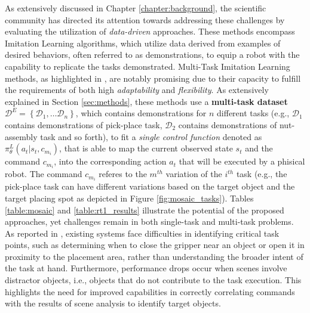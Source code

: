 As extensively discussed in Chapter \ref{chapter:background}, the scientific community has directed its attention towards addressing these challenges by evaluating the utilization of \textit{data-driven} approaches. These methods encompass Imitation Learning algorithms, which utilize data derived from examples of desired behaviors, often referred to as demonstrations, to equip a robot with the capability to replicate the tasks demonstrated.
\newline Multi-Task Imitation Learning methods, as highlighted in \cite{jang2022bc_z, dasari2021transformers_one_shot, mandi2022towards_more_generalizable_one_shot, brohan2022rt}, are notably promising due to their capacity to fulfill the requirements of both high \textit{adaptability} and \textit{flexibility}. As extensively explained in Section \ref{sec:methods}, these methods use a \textbf{multi-task dataset} $\mathcal{D}^{E} = \left \{ \mathcal{D}_{1}, \dots \mathcal{D}_{n}\right \}$, which contains demonstrations for $n$ different tasks (e.g., $\mathcal{D}_{1}$ contains demonstrations of pick-place task, $\mathcal{D}_{2}$ contains demonstrations of nut-assembly task and so forth), to fit a \textit{single control function} denoted as $\pi^{L}_{\theta}(a_{t}|s_{t}, c_{m_{i}})$, that is able to map the current observed state $s_{t}$ and the command $c_{m_{i}}$, into the corresponding action $a_{t}$ that will be executed by a phisical robot. The command $c_{m_{i}}$ referes to the $m^{th}$ variation of the $i^{th}$ task (e.g., the pick-place task can have different variations based on the target object and the target placing spot as depicted in Figure \ref{fig:mosaic_tasks}). Tables \ref{table:mosaic} and \ref{table:rt1_results} illustrate the potential of the proposed approaches, yet challenges remain in both single-task and multi-task problems. As reported in \cite{jang2022bc_z, yu2018daml}, existing systems face difficulties in identifying critical task points, such as determining when to close the gripper near an object or open it in proximity to the placement area, rather than understanding the broader intent of the task at hand. Furthermore, performance drops occur when scenes involve distractor objects, i.e., objects that do not contribute to the task execution. This highlights the need for improved capabilities in correctly correlating commands with the results of scene analysis to identify target objects.

